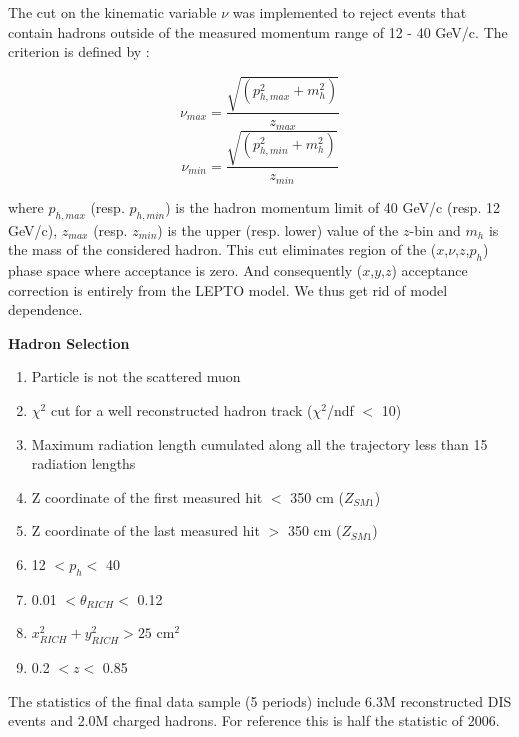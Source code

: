 \documentclass[letterpaper,12pt]{article}
\begin{document}
The cut on the kinematic variable $\nu$ was implemented to reject events that contain hadrons outside of the measured
momentum range of 12 - 40 GeV/c. The criterion is defined by :

\begin{equation}
  \nu_{max} = \frac{\sqrt{(p^2_{h,max}+m^2_h)}}{z_{max}}
\end{equation}
\begin{equation}
  \nu_{min} = \frac{\sqrt{(p^2_{h,min}+m^2_h)}}{z_{min}}
\end{equation}

where $p_{h,max}$ (resp. $p_{h,min}$) is the hadron momentum limit of 40 GeV/c (resp. 12 GeV/c), $z_{max}$ (resp. $z_{min}$)
is the upper (resp. lower) value of the $z$-bin and $m_h$ is the mass of the considered hadron.
This cut eliminates region of the ($x$,$\nu$,$z$,$p_{h}$) phase space where acceptance is zero. And consequently ($x$,$y$,$z$) acceptance correction is entirely from the LEPTO model. We thus get rid of model dependence.

\hfill
\newline

\textbf{Hadron Selection}
\begin{enumerate}
	\item Particle is not the scattered muon
	\item $\chi^2$ cut for a well reconstructed hadron track ($\chi^2$/ndf $<$ 10)
	\item Maximum radiation length cumulated along all the trajectory less than 15 radiation lengths
	\item Z coordinate of the first measured hit $<$ 350 cm ($Z_{SM1}$)
	\item Z coordinate of the last measured hit $>$ 350 cm ($Z_{SM1}$)
	\item 12 $< p_h <$ 40
	\item 0.01 $< \theta_{RICH} <$ 0.12
	\item $x^2_{RICH}+y^2_{RICH}>25$ cm$^2$
	\item 0.2 $< z <$ 0.85
\end{enumerate}

The statistics of the final data sample (5 periods) include 6.3M reconstructed DIS events and 2.0M charged hadrons.
For reference this is half the statistic of 2006.

\newpage
\end{document}
